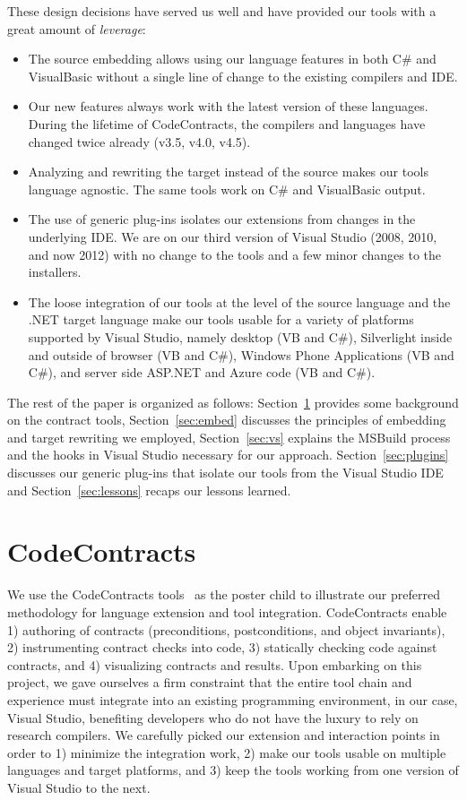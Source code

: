 \documentclass[10pt, conference, compsocconf]{IEEEtran}
\newcommand{\csharp}{C\#}
\begin{document}
These design decisions have served us well and have provided our tools
with a great amount of \emph{leverage}:
\begin{itemize}
\item The source embedding allows using our language features in both
  \csharp{} and VisualBasic without a single line of change to the
  existing compilers and IDE.
\item Our new features always work with the latest
  version of these languages. During the lifetime of CodeContracts,
  the compilers and languages have changed twice already (v3.5, v4.0, v4.5).
\item Analyzing and rewriting the target instead of the source makes our tools language
  agnostic. The same tools work on \csharp{} and VisualBasic output.
\item The use of generic plug-ins isolates our extensions from changes
  in the underlying IDE. We are on our third version of Visual Studio
  (2008, 2010, and now 2012) with no change to the tools and a few
  minor changes to the installers.
\item The loose integration of our tools at the level of the source language and
  the .NET target language make our tools usable for a variety of
  platforms supported by Visual Studio, namely desktop (VB and C\#),
  Silverlight inside and outside of browser (VB and C\#), Windows
  Phone Applications (VB and C\#), and server
  side ASP.NET and Azure code (VB and C\#).
\end{itemize}
The rest of the paper is organized as follows:
Section~\ref{sec:contracts} provides some background on the contract
tools, Section~\ref{sec:embed} discusses the principles of embedding
and target rewriting we employed, Section~\ref{sec:vs} explains the
MSBuild process and the hooks in Visual Studio necessary for our
approach. Section~\ref{sec:plugins} discusses our generic plug-ins that
isolate our tools from the Visual Studio IDE and Section~\ref{sec:lessons}
recaps our lessons learned.

\section{CodeContracts}
\label{sec:contracts}
\noindent
We use the CodeContracts tools~\cite{embedded-cc-sac-oops-2010,cccheck} as the poster child to illustrate our
preferred methodology for language extension and tool integration.
CodeContracts enable 1) authoring of contracts (preconditions, postconditions, and
object invariants), 2) instrumenting contract checks into code, 3) 
statically checking code against contracts, and 4) visualizing contracts
and results. Upon embarking on this project, we gave
ourselves a firm constraint that the entire tool chain and experience
must integrate into an existing programming environment, in our case,
Visual Studio, benefiting developers who do not have the luxury to
rely on research compilers. We carefully picked our extension and interaction
points in order to 1) minimize the integration work, 2) make our tools
 usable on multiple languages and target platforms, and 3) keep the
 tools working from one version of Visual Studio to the next.
\end{document}
